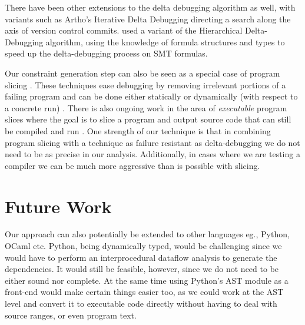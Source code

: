 \documentclass[11pt]{article}
\begin{document}
There have been other extensions to the delta debugging algorithm as well, with
variants such as Artho's Iterative Delta Debugging \citep{idd} directing a search
along the axis of version control commits. \citet{smt} used a
variant of the Hierarchical Delta-Debugging algorithm, using the knowledge of
formula structures and types to speed up the delta-debugging process on SMT
formulas.

Our constraint generation step can also be seen as a special case of program
slicing \citep{weiser81} \citep{tip94}. These techniques ease debugging by
removing irrelevant portions of a failing program and can be done either
statically or dynamically (with respect to a concrete run)
\citep{agrawal90}. There is also ongoing work in the area of \emph{executable}
program slices where the goal is to slice a program and output source code
that can still be compiled and run \citep{horwitz10}. One strength of our
technique is that in combining program slicing with a technique as failure
resistant as delta-debugging we do not need to be as precise in our
analysis. Additionally, in cases where we are testing a compiler we can be much
more aggressive than is possible with slicing.


\section{Future Work}
Our approach can also potentially be extended to other languages eg., Python,
OCaml etc. Python, being dynamically typed, would be challenging since we would
have to perform an interprocedural dataflow analysis to generate the
dependencies. It would still be feasible, however, since we do not need to be
either sound nor complete. At the same time using Python's AST module as a
front-end would make certain things easier too, as we could work at the AST
level and convert it to executable code directly without having to deal with
source ranges, or even program text.



\end{document}
